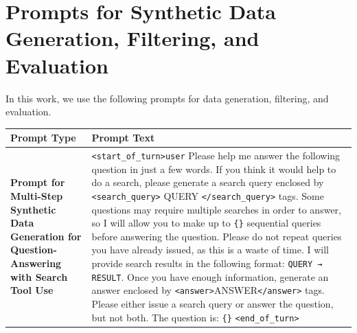 \documentclass{article} %
\begin{document}
\section{Prompts for Synthetic Data Generation, Filtering, and Evaluation}
\label{sec:appendix}

In this work, we use the following prompts for data generation, filtering, and evaluation.

\begin{table}[h!]
    \centering
    \small %
    \begin{tabular}{|p{5cm}|p{8cm}|} %
        \hline
        \textbf{Prompt Type} & \textbf{Prompt Text} \\
        \hline
        \textbf{Prompt for Multi-Step Synthetic Data Generation for Question-Answering with Search Tool Use} & 
        \raggedright 
        \texttt{\textless start\_of\_turn\textgreater user} \newline
        Please help me answer the following question in just a few words. If you think it would help to do a search, please generate a search query enclosed by \texttt{\textless search\_query\textgreater} QUERY \texttt{\textless /search\_query\textgreater} tags. \newline
        Some questions may require multiple searches in order to answer, so I will allow you to make up to \texttt{\{\}} sequential queries before answering the question. \newline
        Please do not repeat queries you have already issued, as this is a waste of time. \newline
        I will provide search results in the following format: \newline
        \texttt{QUERY → RESULT}. \newline
        Once you have enough information, generate an answer enclosed by \texttt{\textless answer\textgreater}ANSWER\texttt{\textless /answer\textgreater} tags. \newline
        Please either issue a search query or answer the question, but not both. \newline
        The question is: \texttt{\{\}} \newline
        \texttt{\textless end\_of\_turn\textgreater} \\
    \end{tabular}
\end{table}
\end{document}
